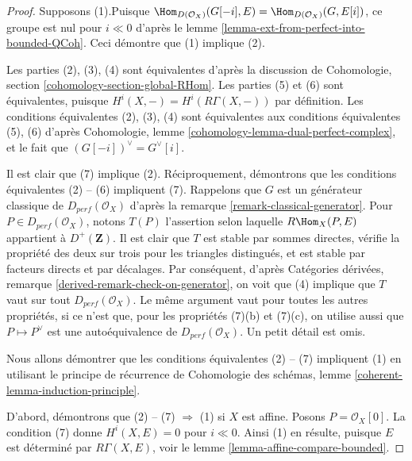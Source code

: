 \begin{proof}
Supposons (1).\newline Puisque
$\Hom_{D(\mathcal{O}_X)}(G[-i], E) = \Hom_{D(\mathcal{O}_X)}(G, E[i])$,
ce groupe est nul pour $i \ll 0$ d'après le
lemme \ref{lemma-ext-from-perfect-into-bounded-QCoh}. Ceci démontre
que (1) implique (2).

\medskip\noindent
Les parties (2), (3), (4) sont équivalentes d'après la discussion de
Cohomologie, section \ref{cohomology-section-global-RHom}.
Les parties (5) et (6) sont équivalentes, puisque $H^i(X, -) = H^i(R\Gamma(X, -))$
par définition. Les conditions équivalentes (2), (3), (4) sont
équivalentes aux conditions équivalentes (5), (6) d'après
Cohomologie, lemme \ref{cohomology-lemma-dual-perfect-complex},
et le fait que $(G[-i])^\vee = G^\vee[i]$.

\medskip\noindent
Il est clair que (7) implique (2). Réciproquement, 
démontrons que les conditions équivalentes (2) -- (6) impliquent (7).
Rappelons que $G$ est un générateur classique de $D_{perf}(\mathcal{O}_X)$ d'après la
remarque \ref{remark-classical-generator}.
Pour $P \in D_{perf}(\mathcal{O}_X)$, notons $T(P)$ l'assertion selon laquelle
$R\Hom_X(P, E)$ appartient à $D^+(\mathbf{Z})$.
Il est clair que $T$ est stable par sommes directes,
vérifie la propriété des deux sur trois pour les triangles
distingués, et est stable par facteurs directs et par décalages.
Par conséquent, d'après Catégories dérivées, remarque \ref{derived-remark-check-on-generator},
on voit que (4) implique que $T$ vaut sur tout $D_{perf}(\mathcal{O}_X)$.
Le même argument vaut pour toutes les autres propriétés, si ce n'est que, pour les propriétés
(7)(b) et (7)(c), on utilise aussi que $P \mapsto P^\vee$ est une
autoéquivalence de $D_{perf}(\mathcal{O}_X)$. Un petit détail est omis.

\medskip\noindent
Nous allons démontrer que les conditions équivalentes (2) -- (7) impliquent (1)
en utilisant le principe de récurrence de
Cohomologie des schémas, lemme \ref{coherent-lemma-induction-principle}.

\medskip\noindent
D'abord, démontrons que (2) -- (7) $\Rightarrow$ (1) si $X$ est affine.
Posons $P = \mathcal{O}_X[0]$. La condition (7) donne $H^i (X, E) = 0$
pour $i \ll 0$. Ainsi (1) en résulte, puisque $E$ est
déterminé par $R\Gamma (X, E)$, voir le lemme \ref{lemma-affine-compare-bounded}.


\end{proof}
